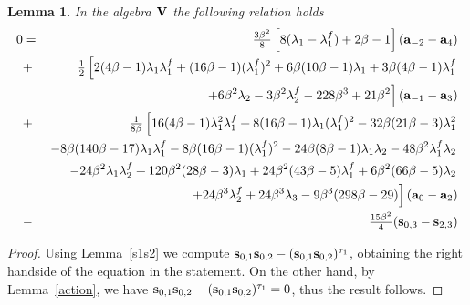 \documentclass[a4paper]{amsart}
\newtheorem{lemma}{Lemma}[section]
\newcommand{\Vo}{{\bf V}}
\newcommand{\lmu}{\lambda_1}
\newcommand{\lmf}{\lambda_1^f}
\newcommand{\lmd}{\lambda_2}
\newcommand{\lmdf}{\lambda_2^f}
\newcommand{\lmt}{\lambda_3}
\newcommand{\bt}{\beta}
\newcommand{\ba}{{\bf a}}
\newcommand{\bs}{{\bf s}}
\begin{document}
\begin{lemma}\label{rel2} %
In the algebra $\Vo$ the following relation holds
\begin{eqnarray*}
0&=&\tfrac{3\bt^2}{8}\left [8(\lmu-\lmf)+2\bt-1\right  ] (\ba_{-2}-\ba_4)\\
&+& \tfrac{1}{2}\left  [ 2(4\bt-1)\lmu\lmf+(16\bt-1)(\lmf)^2+6\bt(10\bt-1)\lmu+3\bt(4\bt-1)\lmf \right .\\
&& \left . +6\bt^2\lmd-3\bt^2\lmdf-228\bt^3+21\bt^2 \right  ] (\ba_{-1}-\ba_3)\\
&+&\tfrac{1}{8\bt}\left  [
16(4\bt-1)\lmu^2\lmf+8(16\bt-1)\lmu(\lmf)^2-32\bt(21\bt-3)\lmu^2 \right .\\
&& \left . -8\bt(140\bt-17)\lmu\lmf-8\bt(16\bt-1)(\lmf)^2-24\bt(8\bt-1)\lmu\lmd-48\bt^2\lmf\lmd \right . \\
&& \left . -24\bt^2\lmu\lmdf+120\bt^2(28\bt-3)\lmu+24\bt^2(43\bt-5)\lmf+6\bt^2(66\bt-5)\lmd \right . \\
&& \left . +24\bt^3\lmdf+24\bt^3\lmt-9\bt^3(298\bt-29)\right ](\ba_0-\ba_2)\\
&-&\tfrac{15\bt^2}{4}(\bs_{0,3}-\bs_{2,3})
\end{eqnarray*}
\end{lemma}
\begin{proof}
Using Lemma~\ref{s1s2} we compute $\bs_{0,1}\bs_{0,2}-(\bs_{0,1}\bs_{0,2})^{\tau_1}$, obtaining the right handside of the equation in the statement. On the other hand, by Lemma~\ref{action}, we have $\bs_{0,1}\bs_{0,2}-(\bs_{0,1}\bs_{0,2})^{\tau_1}=0$, thus the result follows.
\end{proof}
\end{document}
